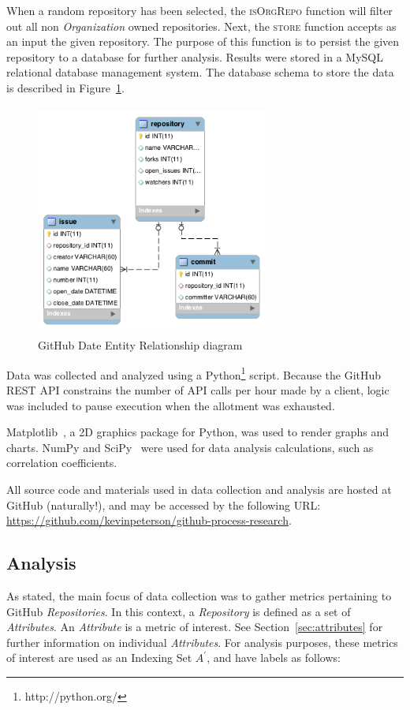 \documentclass{proc}
\begin{document}
When a random repository has been selected, the \textsc{isOrgRepo} function will filter out all non \textit{Organization} owned repositories. Next, the \textsc{store} function accepts as an input the given repository. The purpose of this function is to persist the given repository to a database for further analysis. Results were stored in a MySQL relational database management system. The database schema to store the data is described in Figure~\ref{fig:er_diagram}.

\begin{figure}
\includegraphics[height=3in,width=3in]{images/er.png}
\caption{GitHub Date Entity Relationship diagram}
\label{fig:er_diagram}
\end{figure}

Data was collected and analyzed using a Python\footnote{http://python.org/} script. Because the GitHub REST API constrains the number of API calls per hour made by a client, logic was included to pause execution when the allotment was exhausted.

Matplotlib~\cite{Hunter2007}, a 2D graphics package for Python, was used to render graphs and charts. NumPy and SciPy~\cite{scipy} were used for data analysis calculations, such as correlation coefficients.

All source code and materials used in data collection and analysis are hosted at GitHub (naturally!), and may be accessed by the following URL: \url{https://github.com/kevinpeterson/github-process-research}.

\subsection{Analysis}
As stated, the main focus of data collection was to gather metrics pertaining to GitHub \textit{Repositories}. In this context, a \textit{Repository} is defined as a set of \textit{Attributes}. An \textit{Attribute} is a metric of interest. See Section~\ref{sec:attributes} for further information on individual \textit{Attributes}. For analysis purposes, these metrics of interest are used as an Indexing Set $A^\prime$, and have labels as follows:
\end{document}
